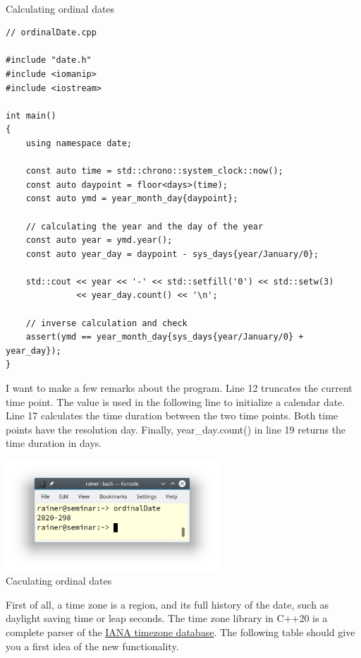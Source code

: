 \hspace*{\fill} \\ %
\noindent
Calculating ordinal dates
\begin{lstlisting}[style=styleCXX]
// ordinalDate.cpp

#include "date.h"
#include <iomanip>
#include <iostream>

int main()
{
	using namespace date;
	
	const auto time = std::chrono::system_clock::now();
	const auto daypoint = floor<days>(time);
	const auto ymd = year_month_day{daypoint};
	
	// calculating the year and the day of the year
	const auto year = ymd.year();
	const auto year_day = daypoint - sys_days{year/January/0};
	
	std::cout << year << '-' << std::setfill('0') << std::setw(3)
	          << year_day.count() << '\n';
	
	// inverse calculation and check
	assert(ymd == year_month_day{sys_days{year/January/0} + year_day});
}
\end{lstlisting}

I want to make a few remarks about the program. Line 12 truncates the current time point. The value is used in the following line to initialize a calendar date. Line 17 calculates the time duration between the two time points. Both time points have the resolution day. Finally, year\_day.count() in line 19 returns the time duration in days.

\begin{center}
\includegraphics[width=0.6\textwidth]{content/3/chapter5/images/26.png}\\
Caculating ordinal dates
\end{center}


First of all, a time zone is a region, and its full history of the date, such as daylight saving time or leap seconds. The time zone library in C++20 is a complete parser of the \href{https://www.iana.org/timezones}{IANA timezone database}. The following table should give you a first idea of the new functionality.

